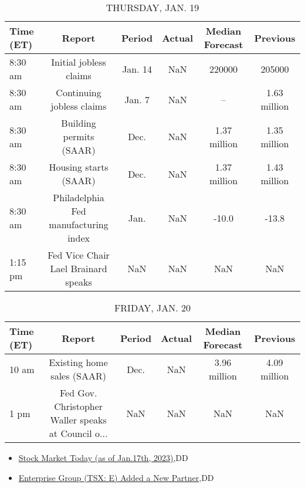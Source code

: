 \documentclass{article}%
\begin{document}
%


\begin{table}[htbp]%
\caption{THURSDAY, JAN. 19}%
\centering%
\begin{adjustbox}{width=1\textwidth}%
\begin{tabular}{lccccc}
\toprule
Time (ET) &                               Report &  Period & Actual & Median Forecast &     Previous \\
\midrule
  8:30 am &               Initial jobless claims & Jan. 14 &    NaN &          220000 &       205000 \\
  8:30 am &            Continuing jobless claims &  Jan. 7 &    NaN &              -- & 1.63 million \\
  8:30 am &              Building permits (SAAR) &    Dec. &    NaN &    1.37 million & 1.35 million \\
  8:30 am &                Housing starts (SAAR) &    Dec. &    NaN &    1.37 million & 1.43 million \\
  8:30 am & Philadelphia Fed manufacturing index &    Jan. &    NaN &           -10.0 &        -13.8 \\
  1:15 pm &  Fed Vice Chair Lael Brainard speaks &     NaN &    NaN &             NaN &          NaN \\
\bottomrule
\end{tabular}
%
\end{adjustbox}%
\end{table}

%


\begin{table}[htbp]%
\caption{FRIDAY, JAN. 20}%
\centering%
\begin{adjustbox}{width=1\textwidth}%
\begin{tabular}{lccccc}
\toprule
Time (ET) &                                             Report & Period & Actual & Median Forecast &     Previous \\
\midrule
    10 am &                         Existing home sales (SAAR) &   Dec. &    NaN &    3.96 million & 4.09 million \\
     1 pm & Fed Gov. Christopher Waller speaks at Council o... &    NaN &    NaN &             NaN &          NaN \\
\bottomrule
\end{tabular}
%
\end{adjustbox}%
\end{table}

%
\begin{itemize}%
\item%
\href{https://reddit.com/r/wallstreetbets/comments/10eag3t/stock\_market\_today\_as\_of\_jan17th\_2023/}{Stock Market Today (as of Jan.17th, 2023)},DD%
\item%
\href{https://reddit.com/r/Baystreetbets/comments/10dewnn/enterprise\_group\_tsx\_e\_added\_a\_new\_partner/}{Enterprise Group (TSX: E) Added a New Partner},DD%
\end{itemize}%
\end{document}
